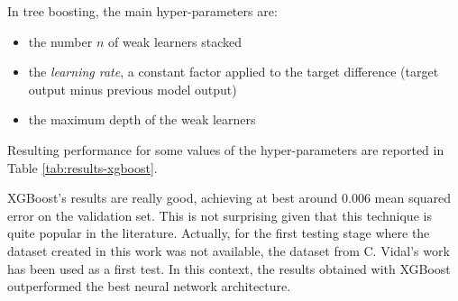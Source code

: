 In tree boosting, the main hyper-parameters are:
\begin{itemize}
    \item the number $n$ of weak learners stacked
    \item the \textit{learning rate}, a constant factor applied to the target difference (target output minus previous model output)
    \item the maximum depth of the weak learners
\end{itemize}

Resulting performance for some values of the hyper-parameters are reported in Table \ref{tab:results-xgboost}.

XGBoost's results are really good, achieving at best around 0.006 mean squared error on the validation set. This is not surprising given that this technique is quite popular in the literature. Actually, for the first testing stage where the dataset created in this work was not available, the dataset from C. Vidal's work has been used as a first test. In this context, the results obtained with XGBoost outperformed the best neural network architecture.

